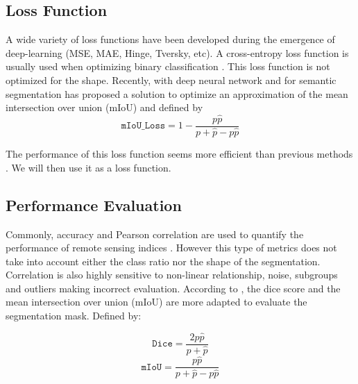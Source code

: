 \documentclass[../thesis.tex]{subfiles}
\begin{document}
	\subsection{Loss Function}
	
	A wide variety of loss functions have been developed during the emergence of deep-learning (MSE, MAE, Hinge, Tversky, etc). A cross-entropy loss function is usually used when optimizing binary classification \cite{Alexey2019}. This loss function is not optimized for the shape. Recently, with deep neural network and for semantic segmentation \cite{MIoU2016} has proposed a solution to optimize an approximation of the mean intersection over union (mIoU) and defined by
	\begin{equation} \texttt{mIoU\_Loss} = 1 - \frac{p\hat{p}}{p+\hat{p} - p\hat{p}} \end{equation}
	
	The performance of this loss function seems more efficient than previous methods \cite{zhou2019iou, van2019deep, Jadon2020}.%
	We will then use it as a loss function.
	
	\subsection{Performance Evaluation}
	\label{sec:methodology:performances}
	
	Commonly, accuracy and Pearson correlation are used to quantify the performance of remote sensing indices \cite{Liu2017, Kokhan119808}. However this type of metrics does not take into account either the class ratio nor the shape of the segmentation. Correlation is also highly sensitive to non-linear relationship, noise, subgroups and outliers \cite{Aggarwal2016, Armstrong2019} making incorrect evaluation. According to \cite{dice2019,Hyun2019}, the dice score  and the mean intersection over union (mIoU) are more adapted to evaluate the segmentation mask. Defined by:
	
	\vspace{-1em}
	\begin{multicols}{2}
		\noindent
		\begin{equation}
		\texttt{Dice} = \frac{2p\hat{p}}  {p+\hat{p}}
		\end{equation}
		\noindent
		\begin{equation}
		\texttt{mIoU} = \frac{p\hat{p}}  {p+\hat{p}-p\hat{p}}
		\end{equation}
	\end{multicols}
	\vspace{-1em}
	
\end{document}
